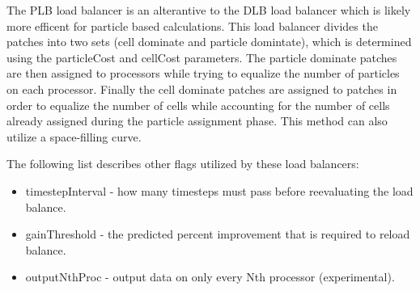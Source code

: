 The PLB load balancer is an alterantive to the DLB load balancer which is
likely more efficent for particle based calculations.  This load balancer
divides the patches into two sets (cell dominate and particle domintate), 
which is determined using the particleCost and cellCost parameters.
The particle dominate patches are then assigned to processors while trying
to equalize the number of particles on each processor.  Finally the 
cell dominate patches are assigned to patches in order to equalize the number
of cells while accounting for the number of cells already assigned during 
the particle assignment phase.  This method can also utilize a space-filling
curve.  

The following list describes other flags utilized by these load balancers:
\begin{itemize}
  \item timestepInterval - how many timesteps must pass before reevaluating the load balance.  
  \item gainThreshold - the predicted percent improvement that is required to reload balance.  
  \item outputNthProc - output data on only every Nth processor (experimental). 
\end{itemize}

